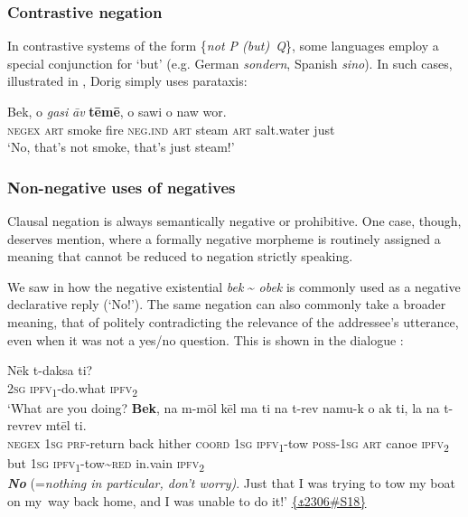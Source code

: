 \documentclass[output=paper,colorlinks,citecolor=brown,draft]{langscibook}
\begin{document}
\subsubsection{Contrastive negation}\label{sec:dor:4.6.1}

In contrastive systems of the form \{\textit{not P (but)~Q}\}, some languages employ a \mbox{special} conjunction for ‘but’ (e.g. German \textit{sondern}, Spanish \textit{sino}). In such cases, illustrated in , Dorig simply uses parataxis:

\ea
    \label{ex:dor:steam}
    \gll Bek, o \textit{gasi} \textit{āv} \textbf{tēmē}, o sawi o naw wor.\\
         \textsc{negex} \textsc{art} smoke fire \textsc{neg.ind} \textsc{art} steam \textsc{art} salt.water just\\
    \glt ‘No, that’s not smoke, that’s just steam!’ 
\z

\subsubsection{Non-negative uses of negatives}\label{sec:dor:4.6.2}

Clausal negation is always semantically negative or prohibitive. One case, though, deserves mention, where a formally negative morpheme is routinely assigned a meaning that cannot be reduced to negation strictly speaking.

We saw in  how the negative existential \textit{bek} {\textasciitilde} \textit{obek} is commonly used as a negative declarative reply (‘No!’). The same negation can also commonly take a broader meaning, that of politely contradicting the relevance of the addressee’s utterance, even when it was not a yes/no question. This is shown in the dialogue :

\ea\label{ex:dor:invain}
    \begin{xlist}
    \label{ex:dor:invainA}
        \gll  Nēk t-daksa ti?\\ 
              \textsc{2sg} \textsc{ipfv\textsubscript{1}}-do.what \textsc{ipfv\textsubscript{2}}\\ 
        \glt ‘What are you doing?
    \label{ex:dor:invainB}
        \gll  \textbf{Bek}, na m-mōl kēl ma ti na t-rev namu-k o ak ti, la na t-revrev mtēl ti.\\ 
               \textsc{negex} \textsc{1sg} \textsc{prf}-return back hither \textsc{coord} \textsc{1sg} \textsc{ipfv\textsubscript{1}}-tow \textsc{poss}-\textsc{1sg} \textsc{art} canoe \textsc{ipfv\textsubscript{2}} but \textsc{1sg} \textsc{ipfv\textsubscript{1}}-tow{\textasciitilde}\textsc{red} in.vain \textsc{ipfv\textsubscript{2}}\\
        \glt \textbf{\textit{No}} (=\textit{nothing in particular, don’t worry)}. Just that I was trying to tow my boat on my~way back home, and I was unable to do it!’ \quad  \href{https://doi.org/10.24397/pangloss-0002306#S18}{\{\texttt{⚓}2306\#S18\}}
    \end{xlist} 
\z 
\end{document}
